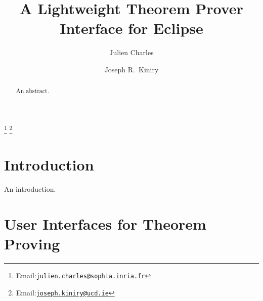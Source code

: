 \documentclass{entcs}
\begin{document}
\begin{frontmatter}

\title{A Lightweight Theorem Prover Interface for Eclipse}

\author{Julien Charles}

\address{Everest Group\\
  INRIA Sophia Antipolis\\
  2004 Route des Lucioles - BP 93\\
  FR-06902 Sophia Antipolis, France}

\author{Joseph R.~Kiniry}

\address{Systems Research Group\\
  School of Computer Science and Informatics\\
  University College Dublin\\
  Belfield, Dublin 4, Ireland}

\thanks[charles]{Email:\href{mailto:julien.charles@sophia.inria.fr}
  {\texttt{\normalshape julien.charles@sophia.inria.fr}}}
\thanks[kiniry]{Email:\href{mailto:joseph.kiniry@ucd.ie}
  {\texttt{\normalshape joseph.kiniry@ucd.ie}}}

\maketitle

\thispagestyle{empty}
\begin{abstract}

  An abstract.  

\end{abstract}

\end{frontmatter}

\section{Introduction}

An introduction.

\section{User Interfaces for Theorem Proving}

\end{document}
